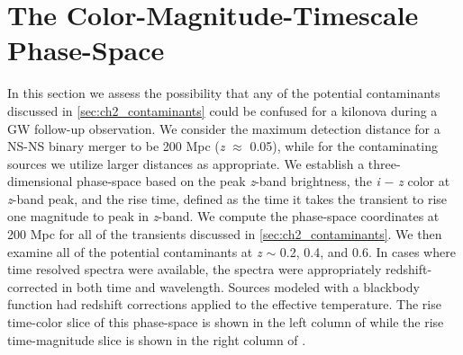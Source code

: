 \section{The Color-Magnitude-Timescale Phase-Space}
\label{sec:ch2_phase}
In this section we assess the possibility that any of the potential contaminants discussed in \cref{sec:ch2_contaminants} could be confused  for a kilonova during a GW follow-up observation. We consider the maximum detection distance for a NS-NS binary merger to be 200 Mpc ({\em z} $\approx$ 0.05), while for the contaminating sources we utilize larger distances as appropriate. We establish a three-dimensional phase-space based on the peak {\em z}-band brightness, the {\em i} $-$ {\em z} color at {\em z}-band peak, and the rise time, defined as the time it takes the transient to rise one magnitude to peak in {\em z}-band. We compute the phase-space coordinates at 200 Mpc for all of the transients discussed in \cref{sec:ch2_contaminants}. We then examine all of the potential contaminants at {\em z} $\sim$ 0.2, 0.4, and 0.6. In cases where time resolved spectra were available, the spectra were appropriately redshift-corrected in both time and wavelength. Sources modeled with a blackbody function had redshift corrections applied to the effective temperature. The rise time-color slice of this phase-space is shown in the left column of  while the rise time-magnitude slice is shown in the right column of .

